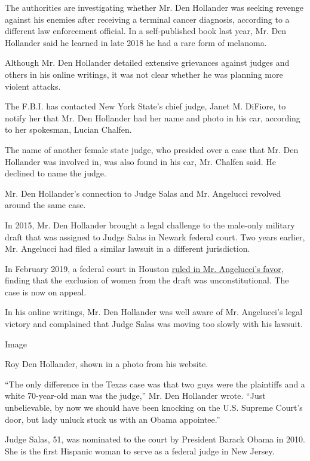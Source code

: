 The authorities are investigating whether Mr. Den Hollander was seeking
revenge against his enemies after receiving a terminal cancer diagnosis,
according to a different law enforcement official. In a self-published
book last year, Mr. Den Hollander said he learned in late 2018 he had a
rare form of melanoma.

Although Mr. Den Hollander detailed extensive grievances against judges
and others in his online writings, it was not clear whether he was
planning more violent attacks.

The F.B.I. has contacted New York State's chief judge, Janet M. DiFiore,
to notify her that Mr. Den Hollander had her name and photo in his car,
according to her spokesman, Lucian Chalfen.

The name of another female state judge, who presided over a case that
Mr. Den Hollander was involved in, was also found in his car, Mr.
Chalfen said. He declined to name the judge.

Mr. Den Hollander's connection to Judge Salas and Mr. Angelucci revolved
around the same case.

In 2015, Mr. Den Hollander brought a legal challenge to the male-only
military draft that was assigned to Judge Salas in Newark federal court.
Two years earlier, Mr. Angelucci had filed a similar lawsuit in a
different jurisdiction.

In February 2019, a federal court in Houston
\href{https://www.nytimes3xbfgragh.onion/2019/02/24/us/military-draft-men-unconstitutional.html}{ruled
in Mr. Angelucci's favor}, finding that the exclusion of women from the
draft was unconstitutional. The case is now on appeal.

In his online writings, Mr. Den Hollander was well aware of Mr.
Angelucci's legal victory and complained that Judge Salas was moving too
slowly with his lawsuit.

Image

Roy Den Hollander, shown in a photo from his website.

``The only difference in the Texas case was that two guys were the
plaintiffs and a white 70-year-old man was the judge,'' Mr. Den
Hollander wrote. ``Just unbelievable, by now we should have been
knocking on the U.S. Supreme Court's door, but lady unluck stuck us with
an Obama appointee.''

Judge Salas, 51, was nominated to the court by President Barack Obama in
2010. She is the first Hispanic woman to serve as a federal judge in New
Jersey.

